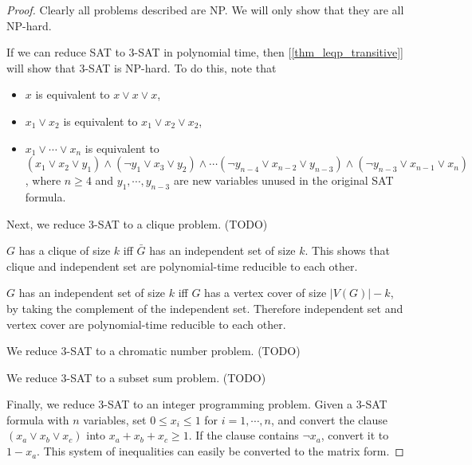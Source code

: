     \begin{proof}
    Clearly all problems described are NP. We will only show that they are all NP-hard.
        
    If we can reduce SAT to 3-SAT in polynomial time, then [\ref{thm_leqp_transitive}] will show that 3-SAT is NP-hard. To do this, note that \begin{itemize}
        \item $x$ is equivalent to $x \vee x \vee x$,
        \item $x_1 \vee x_2$ is equivalent to $x_1 \vee x_2 \vee x_2$,
        \item $x_1 \vee \cdots \vee x_n$ is equivalent to $(x_1 \vee x_2 \vee y_1) \wedge (\neg y_1 \vee x_3 \vee y_2) \wedge \cdots (\neg y_{n-4} \vee x_{n-2} \vee y_{n-3}) \wedge (\neg y_{n-3} \vee x_{n-1} \vee x_{n})$, where $n \geq 4$ and $y_1,\cdots,y_{n-3}$ are new variables unused in the original SAT formula.
    \end{itemize}
        
    Next, we reduce 3-SAT to a clique problem. (TODO)
        
    $G$ has a clique of size $k$ iff $\bar{G}$ has an independent set of size $k$. This shows that clique and independent set are polynomial-time reducible to each other.
        
    $G$ has an independent set of size $k$ iff $G$ has a vertex cover of size $|V(G)| - k$, by taking the complement of the independent set. Therefore independent set and vertex cover are polynomial-time reducible to each other.
        
    We reduce 3-SAT to a chromatic number problem. (TODO)
        
    We reduce 3-SAT to a subset sum problem. (TODO)
        
    Finally, we reduce 3-SAT to an integer programming problem. Given a 3-SAT formula with $n$ variables, set $0 \leq x_i \leq 1$ for $i=1,\cdots,n$, and convert the clause $(x_a \vee x_b \vee x_c)$ into $x_a + x_b + x_c \geq 1$. If the clause contains $\neg x_a$, convert it to $1-x_a$. This system of inequalities can easily be converted to the matrix form.
        
    \end{proof}
